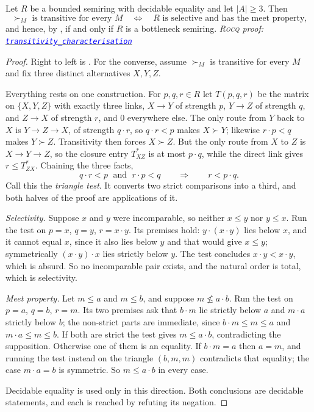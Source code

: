 \documentclass[a4paper,UKenglish,cleveref,autoref,thm-restate,anonymous]{lipics-v2021}
\newcommand{\rocq}{\textsc{Rocq}}
\newcommand{\anonrepo}{https://anonymous.4open.science/r/Semiring_graph_algorithm-000E}
\newcommand{\rocqfile}[2]{\href{\anonrepo/#1}{\textcolor{blue}{\texttt{#2}}}}
\newcommand{\proofat}[2]{{\footnotesize\itshape\rocq{} proof: \rocqfile{#1}{#2}}}
\begin{document}
\begin{theorem}\label{thm:characterisation}
Let $R$ be a bounded semiring with decidable equality and let $|A| \geq 3$.
Then
\[
  \succ_M \text{ is transitive for every } M
  \quad\Longleftrightarrow\quad
  R \text{ is selective and has the meet property,}
\]
and hence, by , if and only if $R$ is a bottleneck
semiring.
\proofat{algorithm/TransitivityN.v}{transitivity\_\allowbreak characterisation}
\end{theorem}

\begin{proof}
Right to left is . For the converse, assume $\succ_M$ is
transitive for every $M$ and fix three distinct alternatives $X, Y, Z$.

Everything rests on one construction. For $p, q, r \in R$ let $T(p,q,r)$ be
the matrix on $\{X,Y,Z\}$ with exactly three links, $X \to Y$ of strength $p$,
$Y \to Z$ of strength $q$, and $Z \to X$ of strength $r$, and $0$ everywhere
else. The only route from $Y$ back to $X$ is $Y \to Z \to X$, of strength
$q \cdot r$, so
$q \cdot r < p$ makes $X \succ Y$; likewise $r \cdot p < q$ makes
$Y \succ Z$. Transitivity then forces $X \succ Z$. But the only route from
$X$ to $Z$ is $X \to Y \to Z$, so the closure entry $T^{\ast}_{XZ}$ is at
most $p \cdot q$, while the direct link gives $r \leq T^{\ast}_{ZX}$.
Chaining the three facts,
\[
  q \cdot r < p \;\text{ and }\; r \cdot p < q
  \qquad\Longrightarrow\qquad
  r < p \cdot q .
\]
Call this the \emph{triangle test}. It converts two strict comparisons into
a third, and both halves of the proof are applications of it.

\emph{Selectivity.} Suppose $x$ and $y$ were incomparable, so neither
$x \leq y$ nor $y \leq x$. Run the test on $p = x$, $q = y$, $r = x \cdot y$.
Its premises hold: $y \cdot (x \cdot y)$ lies below $x$, and it cannot equal
$x$, since it also lies below $y$ and that would give $x \leq y$;
symmetrically $(x \cdot y) \cdot x$ lies strictly below $y$. The test
concludes $x \cdot y < x \cdot y$, which is absurd. So no incomparable pair
exists, and the natural order is total, which is selectivity.

\emph{Meet property.} Let $m \leq a$ and $m \leq b$, and suppose
$m \not\leq a \cdot b$. Run the test on $p = a$, $q = b$, $r = m$. Its two
premises ask that $b \cdot m$ lie strictly below $a$ and $m \cdot a$
strictly below $b$; the non-strict parts are immediate, since
$b \cdot m \leq m \leq a$ and $m \cdot a \leq m \leq b$. If both are strict
the test gives $m \leq a \cdot b$, contradicting the supposition. Otherwise
one of them is an equality. If $b \cdot m = a$ then $a = m$, and running the
test instead on the triangle $(b, m, m)$ contradicts that equality; the case
$m \cdot a = b$ is symmetric. So $m \leq a \cdot b$ in every case.

Decidable equality is used only in this direction. Both conclusions are
decidable statements, and each is reached by refuting its negation.
\end{proof}
\end{document}

